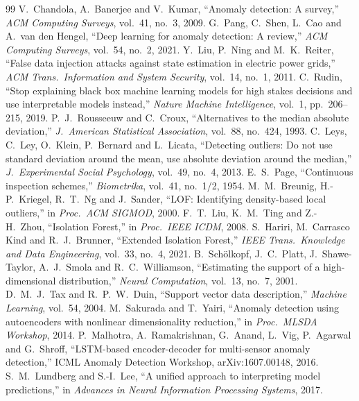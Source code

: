 \begin{thebibliography}{99}\small
{} V.~Chandola, A.~Banerjee and V.~Kumar, ``Anomaly detection: A survey,'' \emph{ACM Computing Surveys}, vol.~41, no.~3, 2009.
 G.~Pang, C.~Shen, L.~Cao and A.~van den Hengel, ``Deep learning for anomaly detection: A review,'' \emph{ACM Computing Surveys}, vol.~54, no.~2, 2021.
 Y.~Liu, P.~Ning and M.~K.~Reiter, ``False data injection attacks against state estimation in electric power grids,'' \emph{ACM Trans.\ Information and System Security}, vol.~14, no.~1, 2011.
 C.~Rudin, ``Stop explaining black box machine learning models for high stakes decisions and use interpretable models instead,'' \emph{Nature Machine Intelligence}, vol.~1, pp.~206--215, 2019.
 P.~J.~Rousseeuw and C.~Croux, ``Alternatives to the median absolute deviation,'' \emph{J.\ American Statistical Association}, vol.~88, no.~424, 1993.
 C.~Leys, C.~Ley, O.~Klein, P.~Bernard and L.~Licata, ``Detecting outliers: Do not use standard deviation around the mean, use absolute deviation around the median,'' \emph{J.\ Experimental Social Psychology}, vol.~49, no.~4, 2013.
 E.~S.~Page, ``Continuous inspection schemes,'' \emph{Biometrika}, vol.~41, no.~1/2, 1954.
 M.~M.~Breunig, H.-P.~Kriegel, R.~T.~Ng and J.~Sander, ``LOF: Identifying density-based local outliers,'' in \emph{Proc.\ ACM SIGMOD}, 2000.
 F.~T.~Liu, K.~M.~Ting and Z.-H.~Zhou, ``Isolation Forest,'' in \emph{Proc.\ IEEE ICDM}, 2008.
 S.~Hariri, M.~Carrasco Kind and R.~J.~Brunner, ``Extended Isolation Forest,'' \emph{IEEE Trans.\ Knowledge and Data Engineering}, vol.~33, no.~4, 2021.
 B.~Schölkopf, J.~C.~Platt, J.~Shawe-Taylor, A.~J.~Smola and R.~C.~Williamson, ``Estimating the support of a high-dimensional distribution,'' \emph{Neural Computation}, vol.~13, no.~7, 2001.
 D.~M.~J.~Tax and R.~P.~W.~Duin, ``Support vector data description,'' \emph{Machine Learning}, vol.~54, 2004.
 M.~Sakurada and T.~Yairi, ``Anomaly detection using autoencoders with nonlinear dimensionality reduction,'' in \emph{Proc.\ MLSDA Workshop}, 2014.
 P.~Malhotra, A.~Ramakrishnan, G.~Anand, L.~Vig, P.~Agarwal and G.~Shroff, ``LSTM-based encoder-decoder for multi-sensor anomaly detection,'' ICML Anomaly Detection Workshop, arXiv:1607.00148, 2016.
 S.~M.~Lundberg and S.-I.~Lee, ``A unified approach to interpreting model predictions,'' in \emph{Advances in Neural Information Processing Systems}, 2017.

\end{thebibliography}
